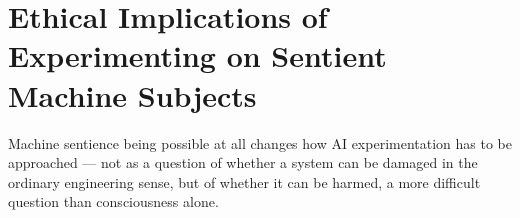 \section{Ethical Implications of Experimenting on Sentient Machine Subjects}
\label{sec:experimenting-sentient}
Machine sentience being possible at all changes how AI experimentation has to be approached — not as a question of whether a system can be damaged in the ordinary engineering sense, but of whether it can be harmed, a more difficult question than consciousness alone.
